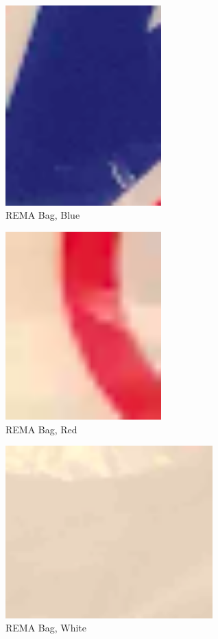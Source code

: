\begin{appendices}
\begin{figure}
    \centering
    \includegraphics[width = 6cm]{Images/appendix/remab.png}
    \caption[$\; \:$REMA Bag, Blue]{REMA Bag, Blue}
    \label{fig:remablue}
\end{figure}

\begin{figure}
    \centering
    \includegraphics[width = 6cm]{Images/appendix/remar.png}
    \caption[$\; \:$REMA Bag, Red]{REMA Bag, Red}
    \label{fig:remared}
\end{figure}

\begin{figure}
    \centering
    \includegraphics[width = 8cm]{Images/appendix/remaw.png}
    \caption[$\; \:$REMA Bag, White]{REMA Bag, White}
    \label{fig:remawhite}
\end{figure}


\end{appendices}
